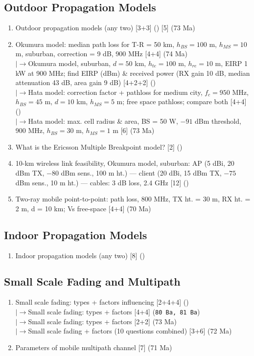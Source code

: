 \documentclass[12pt]{article}
\newcommand{\lb}{\\$\left|\rightarrow\right.$}
\begin{document}
  \subsection{Outdoor Propagation Models}
    \begin{enumerate}[topsep=0pt, noitemsep]
      \item Outdoor propagation models (any two) \hfill [3+3] () [5] (73 Ma)
      \item Okumura model: median path loss for T-R = 50 km,
        $h_{BS}{=}100$ m, $h_{MS}{=}10$ m, suburban, correction = 9 dB, 900 MHz \hfill [4+4] (74 Ma)
        \lb Okumura model, suburban, $d{=}50$ km, $h_{te}{=}100$ m, $h_{re}{=}10$ m, EIRP 1 kW at 900 MHz;
        find EIRP (dBm) \& received power (RX gain 10 dB, median attenuation 43 dB, area gain 9 dB) \hfill [4+2+2] ()
        \lb Hata model: correction factor + pathloss for medium city,
        $f_c{=}950$ MHz, $h_{BS}{=}45$ m, $d{=}10$ km, $h_{MS}{=}5$ m;
        free space pathloss; compare both \hfill [4+4] ()
        \lb Hata model: max. cell radius \& area, BS = 50 W, $-91$ dBm threshold,
        900 MHz, $h_{BS}{=}30$ m, $h_{MS}{=}1$ m \hfill [6] (73 Ma)
      \item What is the Ericsson Multiple Breakpoint model? \hfill [2] ()
      \item 10-km wireless link feasibility, Okumura model, suburban:
        AP (5 dBi, 20 dBm TX, $-80$ dBm sens., 100 m ht.) ---
        client (20 dBi, 15 dBm TX, $-75$ dBm sens., 10 m ht.) ---
        cables: 3 dB loss, 2.4 GHz \hfill [12] ()
      \item Two-ray mobile point-to-point: path loss, 800 MHz,
        TX ht. = 30 m, RX ht. = 2 m, d = 10 km; Vs free-space \hfill [4+4] (70 Ma)
    \end{enumerate}

  \subsection{Indoor Propagation Models}
    \begin{enumerate}[topsep=0pt, noitemsep]
      \item Indoor propagation models (any two) \hfill [8] ()
    \end{enumerate}

  \subsection{Small Scale Fading and Multipath}
    \begin{enumerate}[topsep=0pt, noitemsep]
      \item Small scale fading: types + factors influencing \hfill [2+4+4] ()
        \lb Small scale fading: types + factors \hfill [4+4] (\texttt{80 Ba, 81 Ba})
        \lb Small scale fading: types + factors \hfill [2+2] (73 Ma)
        \lb Small scale fading + factors (10 questions combined) \hfill [3+6] (72 Ma)
      \item Parameters of mobile multipath channel \hfill [7] (71 Ma)
    \end{enumerate}
\end{document}
